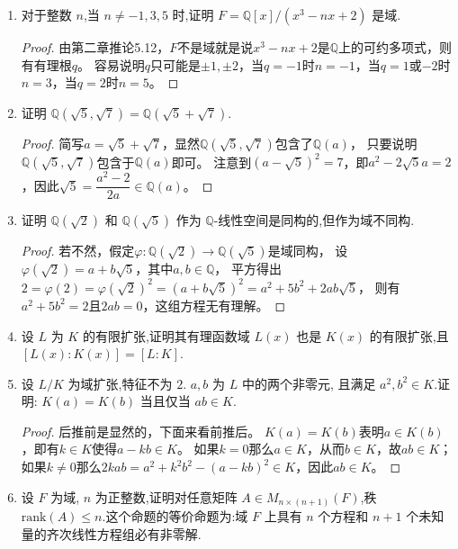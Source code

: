\begin{enumerate}
    \item 对于整数 $ n $,当 $ n \neq -1, 3, 5 $ 时,证明 $ F = \mathbb{Q}[x]/(x^3 - n x + 2) $ 是域.
    \begin{proof}
        由第二章推论5.12，$F$不是域就是说$x^3-nx+2$是$\mathbb{Q}$上的可约多项式，则有有理根$q$。
        容易说明$q$只可能是$\pm1,\pm2$，当$q=-1$时$n=-1$，当$q=1$或$-2$时$n=3$，当$q=2$时$n=5$。
    \end{proof}

    \item 证明 $ \mathbb{Q}(\sqrt{5}, \sqrt{7}) = \mathbb{Q}(\sqrt{5} + \sqrt{7}) $.
    \begin{proof}
        简写$a=\sqrt{5}+\sqrt{7}$，显然$\mathbb{Q}(\sqrt{5},\sqrt{7})$包含了$\mathbb{Q}(a)$，
        只要说明$\mathbb{Q}(\sqrt{5},\sqrt{7})$包含于$\mathbb{Q}(a)$即可。
        注意到$(a-\sqrt{5})^2=7$，即$a^2-2\sqrt{5}a=2$，因此$\sqrt{5}=\dfrac{a^2-2}{2a}\in\mathbb{Q}(a)$。
    \end{proof}

    \item 证明 $ \mathbb{Q}(\sqrt{2}) $ 和 $ \mathbb{Q}(\sqrt{5}) $ 作为 $ \mathbb{Q} $-线性空间是同构的,但作为域不同构.
    \begin{proof}
        若不然，假定$\varphi:\mathbb{Q}(\sqrt{2})\to\mathbb{Q}(\sqrt{5})$是域同构，
        设$\varphi(\sqrt{2})=a+b\sqrt{5}$，其中$a,b\in\mathbb{Q}$，
        平方得出$2=\varphi(2)=\varphi(\sqrt{2})^2=(a+b\sqrt{5})^2=a^2+5b^2+2ab\sqrt{5}$，
        则有$a^2+5b^2=2$且$2ab=0$，这组方程无有理解。
    \end{proof}

    \item 设 $ L $ 为 $ K $ 的有限扩张,证明其有理函数域 $ L(x) $ 也是 $ K(x) $ 的有限扩张,且 $[L(x) : K(x)] = [L : K]$.

    \item 设 $ L/K $ 为域扩张,特征不为 $ 2 $. $ a, b $ 为 $ L $ 中的两个非零元,
    且满足 $ a^2, b^2 \in K $.证明: $K(a) = K(b)$ 当且仅当 $ab \in K$.
    \begin{proof}
        后推前是显然的，下面来看前推后。
        $K(a)=K(b)$表明$a \in K(b)$，即有$k \in K$使得$a-kb \in K$。
        如果$k=0$那么$a \in K$，从而$b \in K$，故$ab \in K$；
        如果$k\ne0$那么$2kab=a^2+k^2b^2-(a-kb)^2 \in K$，因此$ab \in K$。
    \end{proof}

    \item 设 $ F $ 为域, $ n $ 为正整数,证明对任意矩阵 $ A \in M_{n \times (n+1)}(F) $,秩 $ \text{rank}(A) \leqslant n $.这个命题的等价命题为:域 $ F $ 上具有 $ n $ 个方程和 $ n+1 $ 个未知量的齐次线性方程组必有非零解.


\end{enumerate}
